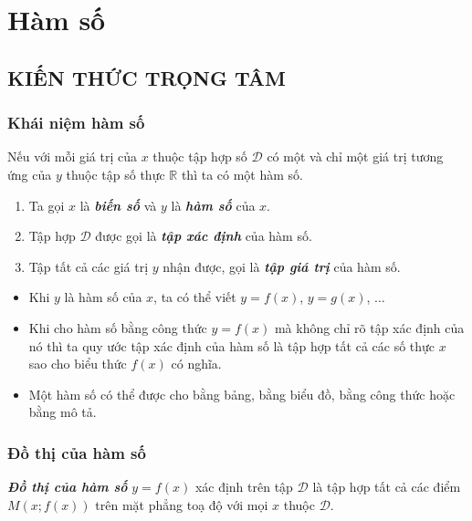 \setcounter{dang}{0}
\setcounter{section}{0}
\section{Hàm số}
\subsection{KIẾN THỨC TRỌNG TÂM}
\subsubsection{Khái niệm hàm số}
\begin{boxdn}\hfill
	Nếu với mỗi giá trị của $x$ thuộc tập hợp số $\mathscr{D}$ có một và chỉ một giá trị tương ứng của $y$ thuộc tập số thực $\mathbb{R}$ thì ta có một hàm số.
	\begin{enumerate}[-]
		\item Ta gọi $x$ là \textit{\textbf{biến số}} và $y$ là \textit{\textbf{hàm số}} của $x$.
		\item Tập hợp $\mathscr{D}$ được gọi là \textit{\textbf{tập xác định}} của hàm số.
		\item Tập tất cả các giá trị $y$ nhận được, gọi là \textit{\textbf{tập giá trị}} của hàm số.
	\end{enumerate}
\end{boxdn}
\begin{note}
	\begin{itemize}
	\item Khi $y$ là hàm số của $x$, ta có thể viết $y=f(x)$, $y=g(x)$, $\ldots$
	\item Khi cho hàm số bằng công thức $y=f(x)$ mà không chỉ rõ tập xác định của nó thì ta quy ước tập xác định của hàm số là tập hợp tất cả các số thực $x$ sao cho biểu thức $f(x)$ có nghĩa.
	\item Một hàm số có thể được cho bằng bảng, bằng biểu đồ, bằng công thức hoặc bằng mô tả.
	\end{itemize}
\end{note}
\subsubsection{Đồ thị của hàm số}
\begin{boxdn}	\textit{\textbf{Đồ thị của hàm số}} $y=f(x)$ xác định trên tập $\mathscr{D}$ là tập hợp tất cả các điểm $M\left(x;f(x)\right)$ trên mặt phẳng toạ độ với mọi $x$ thuộc $\mathscr{D}$.
\end{boxdn}
